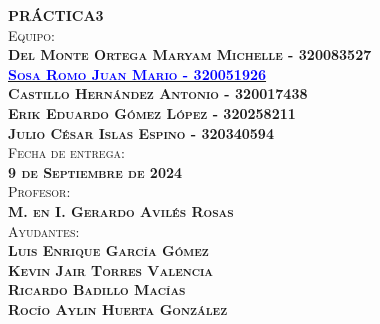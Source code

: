 \begin{titlepage}
\begin{minipage}[c][0.81\textheight][t]{0.75\textwidth}
\begin{center}
			\textsc{\LARGE \textbf{P}\hspace{1cm}\textbf{R}\hspace{1cm}\textbf{Á}\hspace{1cm}\textbf{C}\hspace{1cm}\textbf{T}\hspace{1cm}\textbf{I}\hspace{1cm}\textbf{C}\hspace{1cm}\textbf{A}\hspace{1.3cm}\textbf{3}}\\[2cm]
			\textsc{\Large{Equipo:}\normalsize \\
                \vspace{.3cm}
				\textbf{Del Monte Ortega Maryam Michelle - 320083527 \\
                \vspace{.2cm}
				\href{https://github.com/JuanSosaCiencias}{\textcolor{blue}{Sosa Romo Juan Mario - 320051926}} \\
                \vspace{.2cm}
				Castillo Hernández Antonio - 320017438 \\
                \vspace{.2cm}
                Erik Eduardo Gómez López - 320258211 \\
                \vspace{.2cm}
                Julio César Islas Espino - 320340594}}\\[0.5cm]     
			
			\textsc{{Fecha de entrega: \\ \textbf{9 de Septiembre de 2024}}}\\[0.5cm]        
			
			\textsc{{Profesor: \\ \textbf{M. en I. Gerardo Avilés Rosas}}}\\[0.5cm]  
			
			\textsc{Ayudantes: \\ \textbf{Luis Enrique García Gómez \\ Kevin Jair Torres Valencia \\ Ricardo Badillo Macías \\ Rocío Aylin Huerta González
			} }
			\vspace{0.5cm}
		\end{center}
	\end{minipage}
\end{titlepage}
